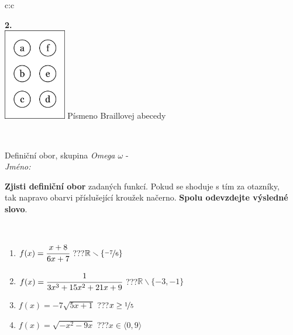 \documentclass[10pt]{report}
\begin{document}
\begin{tabular}{c:c}
\begin{minipage}[c][104.5mm][t]{0.5\linewidth}
\begin{center}
\begin{minipage}{0.20\linewidth}
\begin{center}
{\Huge\bfseries 2.} \\[2mm]
\includegraphics[height=40mm]{../images/braille.png}
{\small Písmeno Braillovej abecedy}
\end{center}
\end{minipage}
\end{center}
\end{minipage}
\\ \hdashline
\begin{minipage}[c][104.5mm][t]{0.5\linewidth}
\begin{center}
\vspace{7mm}
{\huge Definiční obor, skupina \textit{Omega $\omega$} -}\\[5mm]
\textit{Jméno:}\phantom{xxxxxxxxxxxxxxxxxxxxxxxxxxxxxxxxxxxxxxxxxxxxxxxxxxxxxxxxxxxxxxxxx}\\[5mm]
\begin{minipage}{0.95\linewidth}
\begin{center}
\textbf{Zjisti definiční obor} zadaných funkcí. Pokud se shoduje s tím za otazníky,\\tak napravo obarvi příslušející kroužek načerno. \textbf{Spolu odevzdejte výsledné slovo}.
\end{center}
\end{minipage}
\\[1mm]
\begin{minipage}{0.79\linewidth}
\begin{center}
\begin{varwidth}{\linewidth}
\begin{enumerate}
\normalsizerrr
\item $f(x)=\cfrac{x+8}{6x+7}$\quad \dotfill\; ???\;\dotfill \quad $\mathbb{R}\smallsetminus\{\nicefrac{-7}{6}\}$
\item $f(x)=\cfrac{1}{3x^3+15x^2+21x+9}$\quad \dotfill\; ???\;\dotfill \quad $\mathbb{R}\smallsetminus\{-3,-1\}$
\item $f(x)=-7\sqrt{5x+1}$\quad \dotfill\; ???\;\dotfill \quad $x\geq\nicefrac{1}{5}$
\item $f(x)=\sqrt{-x^2-9x}$\quad \dotfill\; ???\;\dotfill \quad $x\in\langle0 , 9\rangle$

\end{enumerate}
\end{varwidth}
\end{center}
\end{minipage}
\end{center}
\end{minipage}
\end{tabular}
\end{document}
